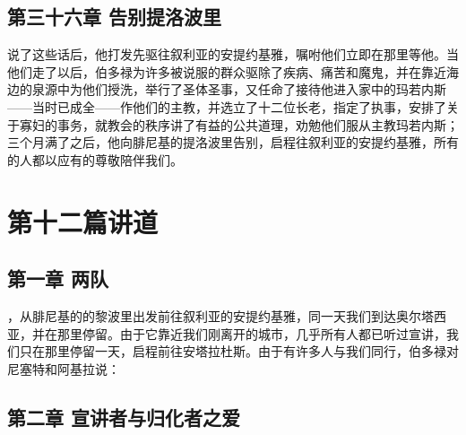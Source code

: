 
\subsection{第三十六章 告别提洛波里}

说了这些话后，他打发先驱往叙利亚的安提约基雅，嘱咐他们立即在那里等他。当他们走了以后，伯多禄为许多被说服的群众驱除了疾病、痛苦和魔鬼，并在靠近海边的泉源中为他们授洗，举行了圣体圣事，又任命了接待他进入家中的玛若内斯——当时已成全——作他们的主教，并选立了十二位长老，指定了执事，安排了关于寡妇的事务，就教会的秩序讲了有益的公共道理，劝勉他们服从主教玛若内斯；三个月满了之后，他向腓尼基的提洛波里告别，启程往叙利亚的安提约基雅，所有的人都以应有的尊敬陪伴我们。\par



\section{第十二篇讲道}


\subsection{第一章 两队}

，从腓尼基的的黎波里出发前往叙利亚的安提约基雅，同一天我们到达奥尔塔西亚，并在那里停留。由于它靠近我们刚离开的城市，几乎所有人都已听过宣讲，我们只在那里停留一天，启程前往安塔拉杜斯。由于有许多人与我们同行，伯多禄对尼塞特和阿基拉说：\par


\subsection{第二章 宣讲者与归化者之爱}

